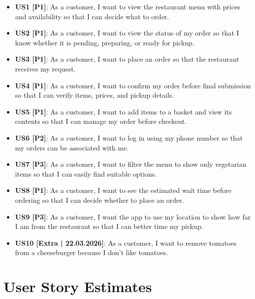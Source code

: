 \documentclass{article}
\begin{document}
\begin{itemize}
    \item \textbf{US1 [P1]}: As a customer, I want to view the restaurant menu with prices and availability so that I can decide what to order.
    
    \item \textbf{US2 [P1]}: As a customer, I want to view the status of my order so that I know whether it is pending, preparing, or ready for pickup.
    
    \item \textbf{US3 [P1]}: As a customer, I want to place an order so that the restaurant receives my request.
    
    \item \textbf{US4 [P1]}: As a customer, I want to confirm my order before final submission so that I can verify items, prices, and pickup details.
    
    \item \textbf{US5 [P1]}: As a customer, I want to add items to a basket and view its contents so that I can manage my order before checkout.
    
    \item \textbf{US6 [P2]}: As a customer, I want to log in using my phone number so that my orders can be associated with me.
    
    \item \textbf{US7 [P3]}: As a customer, I want to filter the menu to show only vegetarian items so that I can easily find suitable options.
    
    \item \textbf{US8 [P1]}: As a customer, I want to see the estimated wait time before ordering so that I can decide whether to place an order.
    
    \item \textbf{US9 [P3]}: As a customer, I want the app to use my location to show how far I am from the restaurant so that I can better time my pickup.

    \item \textbf{US10 [Extra | 22.03.2026]}: As a customer, I want to remove tomatoes from a cheeseburger because I don't like tomatoes.
\end{itemize}


\section{User Story Estimates}
\end{document}
